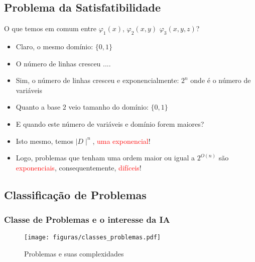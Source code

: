 \documentclass{beamer}
\begin{document}
\subsection{Problema da Satisfatibilidade}

\begin{frame}[fragile]

\begin{block}{O que temos em comum entre $\varphi_1 (x)$, $\varphi_2 (x,y)$
$\varphi_3 (x,y,z)$?}
\pause
\begin{itemize}
  \item Claro, o mesmo domínio: $\{0,1\}$ 
  \item O número de linhas cresceu ....
  \pause
    \item Sim, o número de linhas cresceu e exponencialmente: \textbf{$2^{n}$} onde é o número
    de variáveis 
      \item Quanto a base $2$ veio tamanho do domínio: $\{0,1\}$
      \pause
      \item E quando este número de variáveis e domínio forem maiores?
\pause
      \item Isto mesmo, temos $\mid D\mid ^{n}$, \textcolor{red}{uma exponencial}!
\pause
  \item Logo, problemas que tenham uma ordem maior ou igual a {\Large \textbf{$2^{O(n)}$}}
  são \textcolor{red}{exponenciais}, consequentemente, \textcolor{red}{difíceis}!
  \end{itemize}

\end{block}

\end{frame}



\subsection{Classificação de Problemas}

\begin{frame}
\frametitle{Classe de Problemas e o interesse da IA}

\begin{figure}[ht!]
 \centering
 \texttt{[image: figuras/classes\_problemas.pdf]}
 \caption{Problemas e suas complexidades} 
\end{figure}

\end{frame}
\end{document}
